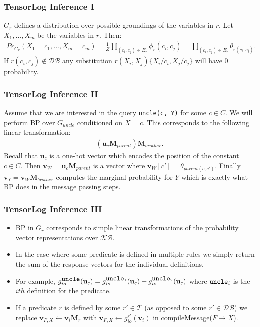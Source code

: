 \documentclass{beamer}
\begin{document}
\begin{frame}[fragile]
\frametitle{TensorLog Inference I}
$G_r$ defines a distribution over possible groundings of the variables in $r$.  Let $X_1, ..., X_m$ be the variables in $r$.  Then:
\begin{gather*}
Pr_{G_r}(X_1 = c_1, ..., X_m = c_m) = \frac{1}{Z} \prod_{(c_i, c_j) \in E_r} \phi_r(c_i, c_j) = \prod_{(c_i, c_j) \in E_r} \theta_{r(c_i, c_j)}.
\end{gather*}
If $r(c_i, c_j) \notin \mathcal{DB}$ any substitution $r(X_i, X_j)\{X_i / c_i, X_j / c_j\}$ will have 0 probability.
\end{frame}

\begin{frame}[fragile]
\frametitle{TensorLog Inference II}
Assume that we are interested in the query \verb!uncle(c, Y)! for some $c \in C$.  We will perform BP over $G_{uncle}$ conditioned on $X = c$.  This corresponds to the following linear transformation:
\begin{gather*}
(\textbf{u}_c \textbf{M}_{parent})\textbf{M}_{brother}.
\end{gather*}
Recall that $\textbf{u}_c$ is a one-hot vector which encodes the position of the constant $c \in C$.  Then $\textbf{v}_W = \textbf{u}_c \textbf{M}_{parent}$ is a vector where $\textbf{v}_W[c'] = \theta_{parent(c, c')}$.  Finally $\textbf{v}_Y = \textbf{v}_W \textbf{M}_{brother}$ computes the marginal probability for $Y$ which is exactly what BP does in the message passing steps.
\end{frame}

\begin{frame}[fragile]
\frametitle{TensorLog Inference III}
\begin{itemize}
	\item BP in $G_r$ corresponds to simple linear transformations of the probability vector representations over $\mathcal{KB}$.
	\item In the case where some predicate is defined in multiple rules we simply return the sum of the response vectors for the individual definitions.
	\item For example, $g_{io}^{\verb!uncle!}(\textbf{u}_c) = g_{io}^{\verb!uncle!_1}(\textbf{u}_c) + g_{io}^{\verb!uncle!_2}(\textbf{u}_c)$ where $\verb!uncle!_i$ is the $ith$ definition for the predicate.
	\item If a predicate $r$ is defined by some $r' \in \mathcal{T}$ (as opposed to some $r' \in \mathcal{DB}$) we replace $\textbf{v}_{F, X} \leftarrow \textbf{v}_i \textbf{M}_r$ with $\textbf{v}_{F, X} \leftarrow g_{io}^{r'}(\textbf{v}_i)$ in compileMessage($F \rightarrow X$).
\end{itemize}
\end{frame}
\end{document}
